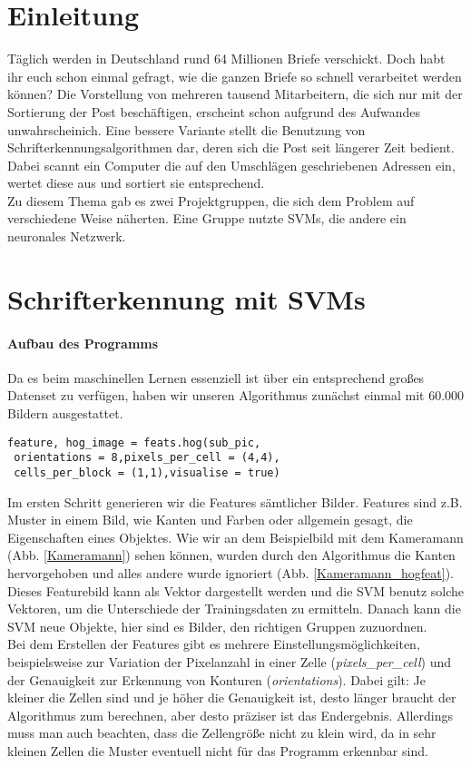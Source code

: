\section{Einleitung}

Täglich werden in Deutschland rund 64 Millionen Briefe verschickt. Doch habt ihr euch schon einmal gefragt, wie die ganzen Briefe so schnell verarbeitet werden können? Die Vorstellung von mehreren tausend Mitarbeitern, die sich nur mit der Sortierung der Post beschäftigen, erscheint schon aufgrund des Aufwandes unwahrscheinich. Eine bessere Variante stellt die Benutzung von Schrifterkennungsalgorithmen dar, deren sich die Post seit längerer Zeit bedient. Dabei scannt ein Computer die auf den Umschlägen geschriebenen Adressen ein, wertet diese aus und sortiert sie entsprechend. \\
Zu diesem Thema gab es zwei Projektgruppen, die sich dem Problem auf verschiedene Weise näherten. Eine Gruppe nutzte SVMs, die andere ein neuronales Netzwerk.


\section{Schrifterkennung mit SVMs}

\paragraph{Aufbau des Programms}

Da es beim maschinellen Lernen essenziell ist über ein entsprechend großes Datenset zu verfügen, haben wir unseren Algorithmus zunächst einmal mit 60.000 Bildern ausgestattet. 

\begin{verbatim}
feature, hog_image = feats.hog(sub_pic,
 orientations = 8,pixels_per_cell = (4,4),
 cells_per_block = (1,1),visualise = true)
\end{verbatim}

Im ersten Schritt generieren wir die Features sämtlicher Bilder. Features sind z.B. Muster in einem Bild, wie Kanten und Farben oder allgemein gesagt, die Eigenschaften eines Objektes. Wie wir an dem Beispielbild mit dem Kameramann (Abb. \ref{Kameramann}) sehen können, wurden durch den Algorithmus die Kanten hervorgehoben und alles andere wurde ignoriert (Abb. \ref{Kameramann_hogfeat}). Dieses Featurebild kann als Vektor dargestellt werden und die SVM benutz solche Vektoren, um die Unterschiede der Trainingsdaten zu ermitteln. Danach kann die SVM neue Objekte, hier sind es Bilder, den richtigen Gruppen zuzuordnen.\\ 
Bei dem Erstellen der Features gibt es mehrere Einstellungsmöglichkeiten, beispielsweise zur Variation der Pixelanzahl in einer Zelle (\textit{pixels\_per\_cell}) und der Genauigkeit zur Erkennung von Konturen (\textit{orientations}). Dabei gilt: Je kleiner die Zellen sind und je höher die Genauigkeit ist, desto länger braucht der Algorithmus zum berechnen, aber desto präziser ist das Endergebnis. Allerdings muss man auch beachten, dass die Zellengröße nicht zu klein wird, da in sehr kleinen Zellen die Muster eventuell nicht für das Programm erkennbar sind. 

